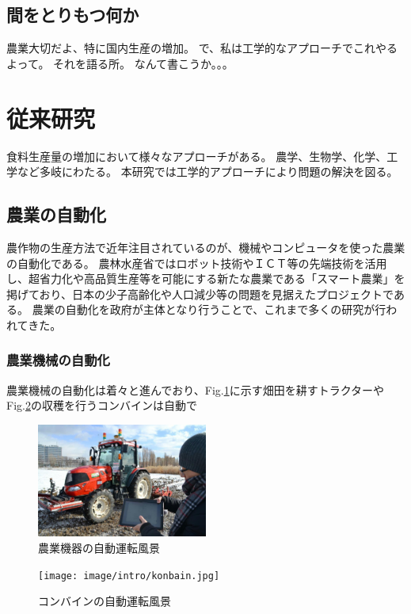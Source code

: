 \subsection{間をとりもつ何か}
農業大切だよ、特に国内生産の増加。
で、私は工学的なアプローチでこれやるよって。
それを語る所。
なんて書こうか。。。

\section{従来研究}
食料生産量の増加において様々なアプローチがある。
農学、生物学、化学、工学など多岐にわたる。
本研究では工学的アプローチにより問題の解決を図る。

\subsection{農業の自動化}
農作物の生産方法で近年注目されているのが、機械やコンピュータを使った農業の自動化である。
農林水産省ではロボット技術やＩＣＴ等の先端技術を活用し、超省力化や高品質生産等を可能にする新たな農業である「スマート農業」を掲げており、日本の少子高齢化や人口減少等の問題を見据えたプロジェクトである。
農業の自動化を政府が主体となり行うことで、これまで多くの研究が行われてきた。
\subsubsection{農業機械の自動化}
農業機械の自動化は着々と進んでおり、Fig.\ref{kikai_torakuta}に示す畑田を耕すトラクターやFig.\ref{kikai_konbain}の収穫を行うコンバインは自動で
\begin{figure}[b] 
    \centering
    \includegraphics[width=0.5\textwidth]{image/intro/torakuta.jpg}
    \caption{農業機器の自動運転風景} 
    \label{kikai_torakuta}
\end{figure}
\begin{figure}[b] 
    \centering
    \texttt{[image: image/intro/konbain.jpg]}
    \caption{コンバインの自動運転風景} 
    \label{kikai_konbain}
\end{figure}

